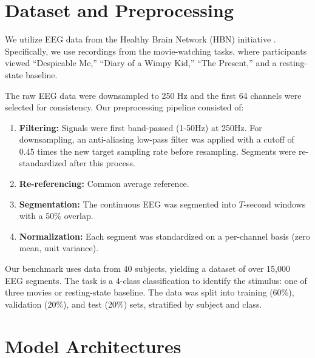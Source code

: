 \documentclass{article}
\begin{document}

\section{Dataset and Preprocessing}
\label{sec:data}


We utilize EEG data from the Healthy Brain Network (HBN) initiative \cite{shirazi2024hbn}. Specifically, we use recordings from the movie-watching tasks, %
where participants viewed ``Despicable Me,'' ``Diary of a Wimpy Kid,'' ``The Present,'' and a resting-state baseline.

The raw EEG data were downsampled to 250 Hz and the first 64 channels were selected for consistency. Our preprocessing pipeline consisted of:
\begin{enumerate}[itemsep=0cm,parsep=0.1cm]
    \item \textbf{Filtering:} Signals were first band-passed (1-50Hz) at 250Hz. For downsampling, an anti-aliasing low-pass filter was applied with a cutoff of 0.45 times the new target sampling rate before resampling. Segments were re-standardized after this process.%
    \item \textbf{Re-referencing:} Common average reference.
    \item \textbf{Segmentation:} The continuous EEG was segmented into $T$-second windows  with a 50\% overlap.
    \item \textbf{Normalization:} Each segment was standardized on a per-channel basis (zero mean, unit variance).
\end{enumerate}

Our benchmark uses data from 40 subjects, yielding a dataset of over 15,000 EEG segments. %
The task is a 4-class classification to identify the stimulus: one of three movies or resting-state baseline.
The data was split into training (60\%), validation (20\%), and test (20\%) sets, stratified by subject and class.

\section{Model Architectures}
\label{sec:models}
\end{document}
